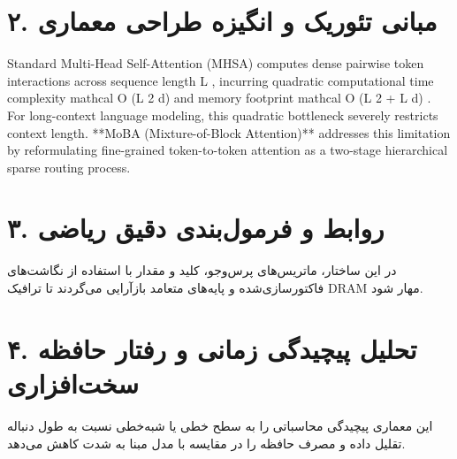 \documentclass[12pt,a4paper]{article}
\begin{document}
\section*{۲. مبانی تئوریک و انگیزه طراحی معماری}
Standard Multi-Head Self-Attention (MHSA) computes dense pairwise token interactions across sequence length L , incurring quadratic computational time complexity mathcal O (L 2 d) and memory footprint mathcal O (L 2 + L d) . For long-context language modeling, this quadratic bottleneck severely restricts context length. **MoBA (Mixture-of-Block Attention)** addresses this limitation by reformulating fine-grained token-to-token attention as a two-stage hierarchical sparse routing process.

\section*{۳. روابط و فرمول‌بندی دقیق ریاضی}
در این ساختار، ماتریس‌های پرس‌وجو، کلید و مقدار با استفاده از نگاشت‌های فاکتورسازی‌شده و پایه‌های متعامد بازآرایی می‌گردند تا ترافیک DRAM مهار شود.

\section*{۴. تحلیل پیچیدگی زمانی و رفتار حافظه سخت‌افزاری}
این معماری پیچیدگی محاسباتی را به سطح خطی یا شبه‌خطی نسبت به طول دنباله تقلیل داده و مصرف حافظه را در مقایسه با مدل مبنا به شدت کاهش می‌دهد.
\end{document}

